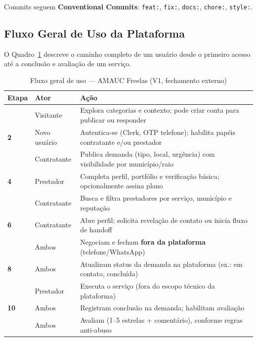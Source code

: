 \documentclass[12pt, a4paper]{article}
\newcommand{\code}[1]{%
  \texttt{\small\colorbox{codeGray}{\vphantom{Ag}#1}}}
\begin{document}
Commits seguem \textbf{Conventional Commits}:
\code{feat:}, \code{fix:}, \code{docs:}, \code{chore:}, \code{style:}.

\subsection{Fluxo Geral de Uso da Plataforma}

O Quadro~\ref{tab:fluxo} descreve o caminho completo de um usuário
desde o primeiro acesso até a conclusão e avaliação de um serviço.

\begin{table}[H]
  \centering
  \caption{Fluxo geral de uso --- AMAUC Freelas (V1, fechamento externo)}
  \label{tab:fluxo}
  \begin{tabularx}{\textwidth}{%
    >{\centering\bfseries\arraybackslash}p{1.1cm}
    >{\centering\arraybackslash}p{3.2cm}
    >{\raggedright\arraybackslash}X}
  \toprule
  \rowcolor{ifcGreen!20}
  \textbf{Etapa} & \textbf{Ator} & \textbf{Ação} \\
  \midrule
  1  & Visitante          & Explora categorias e contexto; pode criar conta para publicar ou responder \\
  \rowcolor{rowGray}
  2  & Novo usuário       & Autentica-se (Clerk, OTP telefone); habilita papéis contratante e/ou prestador \\
  3  & Contratante        & Publica demanda (tipo, local, urgência) com visibilidade por município/raio \\
  \rowcolor{rowGray}
  4  & Prestador          & Completa perfil, portfólio e verificação básica; opcionalmente assina plano \\
  5  & Contratante        & Busca e filtra prestadores por serviço, município e reputação \\
  \rowcolor{rowGray}
  6  & Contratante        & Abre perfil; solicita revelação de contato ou inicia fluxo de handoff \\
  7  & Ambos              & Negociam e fecham \textbf{fora da plataforma} (telefone/WhatsApp) \\
  \rowcolor{rowGray}
  8  & Ambos              & Atualizam status da demanda na plataforma (ex.: em contato, concluída) \\
  9  & Prestador          & Executa o serviço (fora do escopo técnico da plataforma) \\
  \rowcolor{rowGray}
  10 & Ambos              & Registram conclusão na demanda; habilitam avaliação \\
  11 & Ambos              & Avaliam (1--5 estrelas + comentário), conforme regras anti-abuso \\
  \bottomrule
  \end{tabularx}
\end{table}
\end{document}
